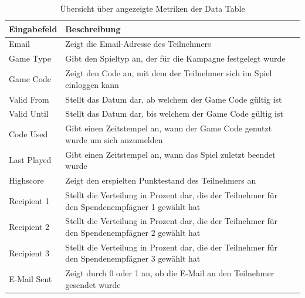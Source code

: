 \documentclass[
	ngerman,
	BCOR=8mm,
	headings=normal,
	parskip=half,
	headsepline,
	automark,
	listof=totoc,
	bibliography=totoc,
]{scrreprt}
\begin{document}
\begin{table}[h]
    \centering
    \renewcommand{\arraystretch}{1.3}
    \begin{tabular}{|p{3cm}|p{6cm}|p{5cm}|}
        \hline
        \textbf{Eingabefeld} & \textbf{Beschreibung}  \\
        \hline
        Email & Zeigt die Email-Adresse des Teilnehmers \\
        \hline
        Game Type & Gibt den Spieltyp an, der für die Kampagne festgelegt wurde \\
        \hline
        Game Code & Zeigt den Code an, mit dem der Teilnehmer sich im Spiel einloggen kann \\
        \hline
        Valid From & Stellt das Datum dar, ab welchem der Game Code gültig ist \\
        \hline
        Valid Until & Stellt das Datum dar, bis welchem der Game Code gültig ist  \\
        \hline
        Code Used & Gibt einen Zeitstempel an, wann der Game Code genutzt wurde um sich anzumelden \\
        \hline
        Last Played & Gibt einen Zeitstempel an, wann das Spiel zuletzt beendet wurde  \\
        \hline
        Highscore & Zeigt den erspielten Punktestand des Teilnehmers an \\
        \hline
        Recipient 1 & Stellt die Verteilung in Prozent dar, die der Teilnehmer für den Spendenempfägner 1 gewählt hat \\
        \hline
        Recipient 2 & Stellt die Verteilung in Prozent dar, die der Teilnehmer für den Spendenempfägner 2 gewählt hat \\
        \hline
        Recipient 3 & Stellt die Verteilung in Prozent dar, die der Teilnehmer für den Spendenempfägner 3 gewählt hat \\
        \hline
        E-Mail Sent & Zeigt durch 0 oder 1 an, ob die E-Mail an den Teilnehmer gesendet wurde  \\
        \hline

    \end{tabular}
    \caption{Übersicht über angezeigte Metriken der Data Table}
    \label{tab:metriken_datatable}
\end{table}
\end{document}
